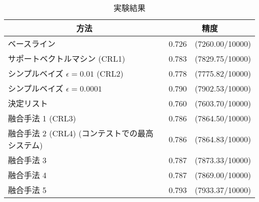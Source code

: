 \begin{table*}[t]
\caption{実験結果}
\label{tab:result}
  \begin{center}
\small\renewcommand{\arraystretch}{}
\hspace*{-1cm}
\begin{tabular}[c]{|l|cc|}\hline
\multicolumn{1}{|c|}{方法}  & \multicolumn{2}{|c|}{精度} \\\hline
ベースライン & 0.726  & (7260.00/10000) \\
サポートベクトルマシン (CRL1)            & 0.783 & (7829.75/10000) \\
シンプルベイズ $\epsilon=0.01$ (CRL2)            & 0.778  & (7775.82/10000)\\
シンプルベイズ $\epsilon=0.0001$   & 0.790  & (7902.53/10000)\\
決定リスト            & 0.760 & (7603.70/10000) \\
融合手法 1 (CRL3)            & 0.786  & (7864.50/10000) \\
融合手法 2 (CRL4) (コンテストでの最高システム)   & 0.786  & (7864.83/10000) \\
融合手法 3               & 0.787  & (7873.33/10000) \\
融合手法 4            & 0.787  & (7869.00/10000) \\
融合手法 5              & 0.793  & (7933.37/10000)\\\hline
\end{tabular}
\end{center}
\end{table*}


